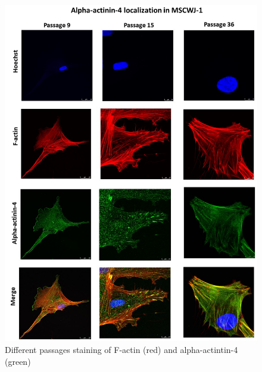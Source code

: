 \documentclass[english,authoryear]{elsarticle}
\begin{document}
\begin{figure}[hbt!]
\centering
\includegraphics[width=0.9\linewidth]{fig_a4-actin.jpg}
\caption{Different passages staining of F-actin (red) and alpha-actintin-4 (green)}
\label{a4-actin}
\end{figure}
\end{document}
